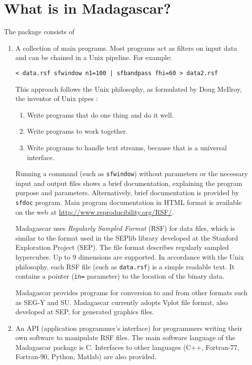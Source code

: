 \section{What is in Madagascar?}

The package consists of
\begin{enumerate}
\item A collection of main programs. Most programs act as filters on input
  data and can be chained in a Unix pipeline. For example:
\begin{verbatim}
< data.rsf sfwindow n1=100 | sfbandpass fhi=60 > data2.rsf
\end{verbatim}
This approach follows the Unix philosophy, as formulated by Doug McIlroy,
the inventor of Unix pipes \cite[]{salus}:
\begin{enumerate}
\item Write programs that do one thing and do it well. 
\item Write programs to work together. 
\item Write programs to handle text streams, because that is a universal
  interface.
\end{enumerate}

Running a command (such as \texttt{sfwindow}) without parameters or the
necessary input and output files shows a brief documentation, explaining the
program purpose and parameters.  Alternatively, brief documentation is
provided by \texttt{sfdoc} program. Main program documentation in HTML format
is available on the web at \url{http://www.reproducibility.org/RSF/}.

Madagascar uses \emph{Regularly Sampled Format} (RSF) for data files,
which is similar to the format used in the SEPlib library developed at
the Stanford Exploration Project (SEP). The file format describes
regularly sampled hypercubes. Up to 9 dimensions are supported. In
accordance with the Unix philosophy, each RSF file (such as
\texttt{data.rsf}) is a simple readable text. It contains a pointer
(\texttt{in=} parameter) to the location of the binary data.

Madagascar provides programs for conversion to and from other formats
such as SEG-Y and SU. Madagascar currently adopts Vplot file format,
also developed at SEP, for generated graphics files.

\item An API (application programmer's interface) for programmers writing
  their own software to manipulate RSF files. The main software language of
  the Madagascar package is C. Interfaces to other languages (C++, Fortran-77,
  Fortran-90, Python, Matlab) are also provided.
  

\end{enumerate}
